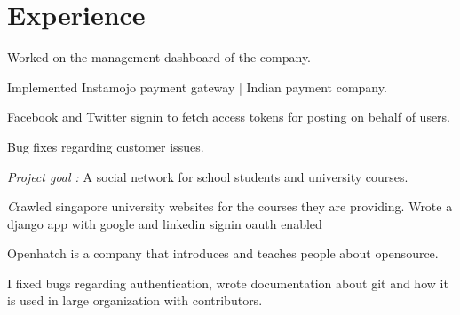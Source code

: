\documentclass[]{deedy-resume-openfont}
\begin{document}
\begin{minipage}[t]{0.66\textwidth}


\section{Experience}

\vspace{\topsep} %
\begin{tightemize}
\item Worked on the management dashboard of the company.
\item Implemented Instamojo payment gateway | Indian payment company.
\item Facebook and Twitter signin to fetch access tokens for posting on behalf of users.
\item Bug fixes regarding customer issues.
\vspace{\topsep} %
\end{tightemize}

\begin{tightemize}
\item \emph{Project goal :} A social network for school students and university courses.
\item \emph Crawled singapore university websites for the courses they are providing. Wrote a django app with google and linkedin signin oauth enabled \end{tightemize}
\sectionsep

\vspace{\topsep} %
\begin{tightemize}
\item Openhatch is a company that introduces and teaches people about opensource.
\item I fixed bugs regarding authentication, wrote documentation about git and how it is used in large organization with contributors.\end{tightemize}
\sectionsep


\end{minipage}
\end{document}
